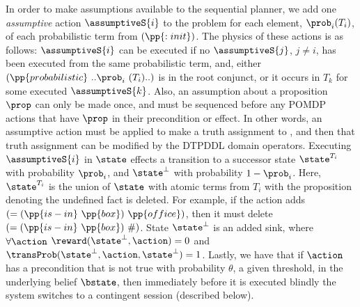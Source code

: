 \documentclass{article}
\begin{document}
In order to make assumptions available to the sequential planner, we
add one {\em assumptive} action $\assumptiveS{i}$ to the problem for
each element, $\prob_i (T_i)$, of each probabilistic term from
$(\pp{:init})$. The physics of these actions is as
follows: $\assumptiveS{i}$ can be executed if no $\assumptiveS{j}$,
$j \neq i$, has been executed from the same probabilistic term, and,
either $(\pp{probabilistic}~..\prob_i~(T_i)..)$ is in the root
conjunct, or it occurs in $T_k$ for some executed
$\assumptiveS{k}$. Also, an assumption about a proposition
$\prop$ can only be made once, and must be sequenced before any POMDP
actions that have $\prop$ in their precondition or effect.
In other words, an assumptive action
must be applied to make a truth assignment to \prop, and then that
truth assignment can be modified by the DTPDDL domain operators.
Executing $\assumptiveS{i}$ in $\state$ effects a transition to a
successor state $\state^{T_i}$ with probability $\prob_i$, and
$\state^\bot$ with probability $1 - \prob_i$. Here, $\state^{T_i}$ is
the union of $\state$ with atomic terms from $T_i$ with the
proposition denoting the undefined fact is deleted. For example, if
the action adds $(=(\pp{is-in}~\pp{box})~\pp{office})$, then it must
delete $(=(\pp{is-in}~\pp{box})~\#)$. State $\state^\bot$ is an added
sink, where $\forall\action$ $\reward(\state^\bot, \action) = 0$ and
$\transProb(\state^\bot, \action, \state^\bot) = 1$.
Lastly, we have that if $\action$ has a precondition that is not true
with probability $\theta$, a given threshold, in the underlying belief
$\bstate$, then immediately before it is executed blindly the system
switches to a contingent session (described below).


\end{document}

